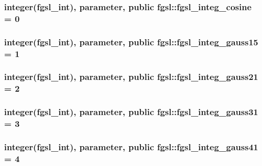 \hypertarget{classfgsl_a32ea398e71abe5dd44ef510e11dcfa87}{
\subsubsection[{fgsl\-\_\-integ\-\_\-cosine}]{\setlength{\rightskip}{0pt plus 5cm}integer({\bf fgsl\-\_\-int}), parameter, public fgsl\-::fgsl\-\_\-integ\-\_\-cosine = 0}}\label{classfgsl_a32ea398e71abe5dd44ef510e11dcfa87}
\hypertarget{classfgsl_ae892609677dce6cab285f1a12f956f84}{
\subsubsection[{fgsl\-\_\-integ\-\_\-gauss15}]{\setlength{\rightskip}{0pt plus 5cm}integer({\bf fgsl\-\_\-int}), parameter, public fgsl\-::fgsl\-\_\-integ\-\_\-gauss15 = 1}}\label{classfgsl_ae892609677dce6cab285f1a12f956f84}
\hypertarget{classfgsl_a3c4e8f9478c6a8ab3bab6580929c8894}{
\subsubsection[{fgsl\-\_\-integ\-\_\-gauss21}]{\setlength{\rightskip}{0pt plus 5cm}integer({\bf fgsl\-\_\-int}), parameter, public fgsl\-::fgsl\-\_\-integ\-\_\-gauss21 = 2}}\label{classfgsl_a3c4e8f9478c6a8ab3bab6580929c8894}
\hypertarget{classfgsl_a6fd868988f11aa3c2ab7c6a3d60ab1a0}{
\subsubsection[{fgsl\-\_\-integ\-\_\-gauss31}]{\setlength{\rightskip}{0pt plus 5cm}integer({\bf fgsl\-\_\-int}), parameter, public fgsl\-::fgsl\-\_\-integ\-\_\-gauss31 = 3}}\label{classfgsl_a6fd868988f11aa3c2ab7c6a3d60ab1a0}
\hypertarget{classfgsl_a5c219f8f951d411c63849088e0e224da}{
\subsubsection[{fgsl\-\_\-integ\-\_\-gauss41}]{\setlength{\rightskip}{0pt plus 5cm}integer({\bf fgsl\-\_\-int}), parameter, public fgsl\-::fgsl\-\_\-integ\-\_\-gauss41 = 4}}\label{classfgsl_a5c219f8f951d411c63849088e0e224da}
